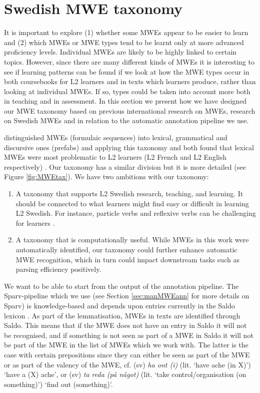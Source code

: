 \documentclass[output=paper,colorlinks,citecolor=brown]{langscibook}
\begin{document}
\section{Swedish MWE taxonomy}\label{sec:SweMWEtax}

It is important  
to explore (1) whether some MWEs appear to be easier to learn and (2) which MWEs or MWE types tend to be learnt only at more advanced proficiency levels. Individual MWEs are likely to be highly linked to certain topics. However, since there are many different kinds of MWEs it is interesting to see if learning patterns can be found if we look at how the MWE types occur in both coursebooks for L2 learners and in texts which learners produce, rather than looking at individual MWEs. 
If so, types could be taken into account more both in teaching and in assessment. 
In this section we present how we have designed our MWE taxonomy based on previous international research on MWEs, research on Swedish MWEs and in relation to the automatic annotation pipeline we use.


\citet{erman2000idiom} distinguished MWEs (formulaic sequences) into lexical, 
grammatical and discursive ones (prefabs) and applying this taxonomy \citet{forsberg2008langage} and \citet{lewis2008idiom} both found that lexical MWEs were most problematic to L2 learners (L2 French and L2 English respectively) \citep{forsberg2010can}. Our taxonomy has a similar division but it is more detailed (see Figure \ref{fig:MWEtax}). We have two ambitions with our taxonomy:
\begin{enumerate}
\item A taxonomy that supports L2 Swedish research, teaching, and learning. It should be connected to what learners might find easy or difficult in learning L2 Swedish. For instance, particle verbs  
and reflexive verbs  
can be challenging for learners \citep[cf.][]{enstrom1990feltyper,ekberg1999anvandningen}. 
\item A taxonomy that is computationally useful. While MWEs in this work were automatically identified, our taxonomy could further enhance automatic MWE recognition, which in turn could impact downstream tasks such as parsing efficiency positively. 
\end{enumerate}

We want to be able to start from the output of the  
annotation pipeline. 
The Sparv-pipeline \citep{borin2016sparv} which we use (see Section \ref{sec:manMWEann} for more details on Sparv) is knowledge-based and depends upon entries currently in the Saldo lexicon \citep{borin2013saldo}. As part of the lemmatisation, MWEs in texts are identified through Saldo. This means that if the MWE does not have an entry in Saldo it will not be recognised, and if something is not seen as part of a MWE in Saldo it will not be part of the MWE in the list of MWEs which we work with. The latter is the case with certain prepositions since they can either be seen as part of the MWE or as part of the valency of the MWE,  
cf. (sv) \textit{ha ont (i)} 
(lit. `have ache (in X)') `have a (X) ache', or (sv) \textit{ta reda (på något)}  
(lit. `take control/organisation (on something)') `find out (something)'. 
\end{document}
